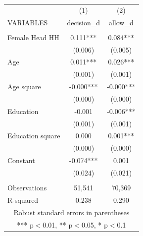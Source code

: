 \documentclass[]{article}
\begin{document}
\begin{tabular}{lcc} \hline
 & (1) & (2) \\
VARIABLES & decision\_d & allow\_d \\ \hline
 &  &  \\
Female Head HH & 0.111*** & 0.084*** \\
 & (0.006) & (0.005) \\
Age & 0.011*** & 0.026*** \\
 & (0.001) & (0.001) \\
Age square & -0.000*** & -0.000*** \\
 & (0.000) & (0.000) \\
Education & -0.001 & -0.006*** \\
 & (0.001) & (0.001) \\
Education square & 0.000 & 0.001*** \\
 & (0.000) & (0.000) \\
Constant & -0.074*** & 0.001 \\
 & (0.024) & (0.021) \\
 &  &  \\
Observations & 51,541 & 70,369 \\
 R-squared & 0.238 & 0.290 \\ \hline
\multicolumn{3}{c}{ Robust standard errors in parentheses} \\
\multicolumn{3}{c}{ *** p$<$0.01, ** p$<$0.05, * p$<$0.1} \\
\end{tabular}
\end{document}
